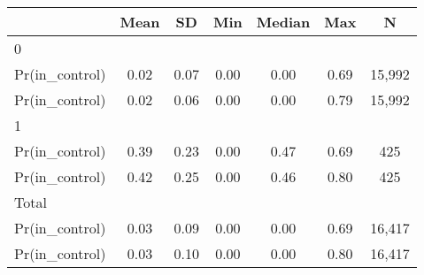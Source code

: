 {
\def\sym#1{\ifmmode^{#1}\else\(^{#1}\)\fi}
\begin{tabular}{l*{1}{cccccc}}
\hline\hline
                    &        Mean&          SD&         Min&      Median&         Max&           N\\
\hline
0                   &            &            &            &            &            &            \\
Pr(in\_control)      &        0.02&        0.07&        0.00&        0.00&        0.69&      15,992\\
Pr(in\_control)      &        0.02&        0.06&        0.00&        0.00&        0.79&      15,992\\
\hline
1                   &            &            &            &            &            &            \\
Pr(in\_control)      &        0.39&        0.23&        0.00&        0.47&        0.69&         425\\
Pr(in\_control)      &        0.42&        0.25&        0.00&        0.46&        0.80&         425\\
\hline
Total               &            &            &            &            &            &            \\
Pr(in\_control)      &        0.03&        0.09&        0.00&        0.00&        0.69&      16,417\\
Pr(in\_control)      &        0.03&        0.10&        0.00&        0.00&        0.80&      16,417\\
\hline\hline
\end{tabular}
}
